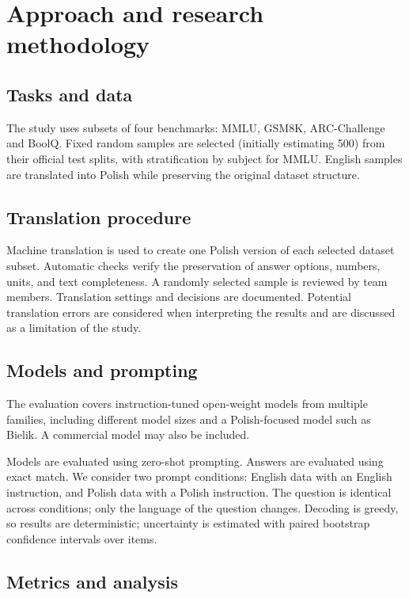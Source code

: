 \documentclass[11pt]{article}
\begin{document}
\section{Approach and research methodology}


\subsection*{Tasks and data}
The study uses subsets of four benchmarks: MMLU, GSM8K, ARC-Challenge and BoolQ. Fixed random samples are selected (initially estimating 500) from their official test splits, with stratification by subject for MMLU. English samples are translated into Polish while preserving the original dataset structure.

\subsection*{Translation procedure}
Machine translation is used to create one Polish version of
each selected dataset subset. Automatic checks verify the
preservation of answer options, numbers, units, and text
completeness. A randomly selected sample is reviewed by team members.
Translation settings and decisions are documented.
Potential translation errors are considered when interpreting
the results and are discussed as a limitation of the study.

\subsection*{Models and prompting}
The evaluation covers instruction-tuned open-weight models from multiple families, including different model sizes and a Polish-focused model such as Bielik. A commercial model may also be included.

Models are evaluated using zero-shot prompting. Answers are evaluated using exact match.
We consider two prompt conditions: English data with an English
instruction, and Polish data with a
Polish instruction. The question is identical across conditions; only the
language of the question changes. Decoding is greedy, so results are deterministic; uncertainty is estimated
with paired bootstrap confidence intervals over items.

\subsection*{Metrics and analysis}
\end{document}
